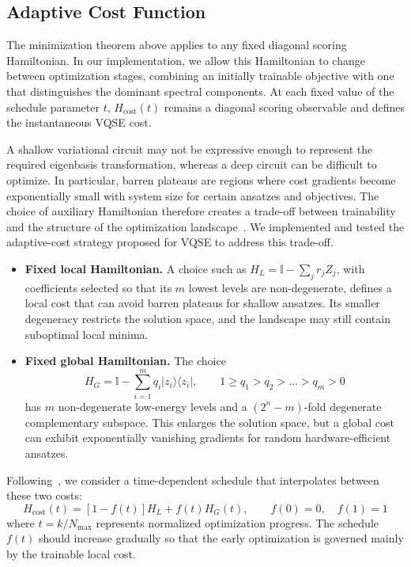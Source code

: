 \subsection{Adaptive Cost Function}\label{sec:vqse_adaptive_cost}

The minimization theorem above applies to any fixed diagonal scoring Hamiltonian. In our implementation, we allow this Hamiltonian to change between optimization stages, combining an initially trainable objective with one that distinguishes the dominant spectral components. At each fixed value of the schedule parameter $t$, $H_{\mathrm{cost}}(t)$ remains a diagonal scoring observable and defines the instantaneous VQSE cost.

A shallow variational circuit may not be expressive enough to represent the required eigenbasis transformation, whereas a deep circuit can be difficult to optimize. In particular, barren plateaus are regions where cost gradients become exponentially small with system size for certain ansatzes and objectives. The choice of auxiliary Hamiltonian therefore creates a trade-off between trainability and the structure of the optimization landscape~\cite{cerezo2022vqse}. We implemented and tested the adaptive-cost strategy proposed for VQSE to address this trade-off.

\begin{itemize}

    \item \textbf{Fixed local Hamiltonian.} A choice such as $H_L=\mathbb{I}-\sum_j r_jZ_j$, with coefficients selected so that its $m$ lowest levels are non-degenerate, defines a local cost that can avoid barren plateaus for shallow ansatzes. Its smaller degeneracy restricts the solution space, and the landscape may still contain suboptimal local minima.
    \item \textbf{Fixed global Hamiltonian.} The choice
          \begin{equation}
              H_G=\mathbb{I}-\sum_{i=1}^m q_i|z_i\rangle\langle z_i|,
              \qquad 1\geq q_1>q_2>\dots>q_m>0
              \label{eq:vqse_global_hamiltonian}
          \end{equation}
          has $m$ non-degenerate low-energy levels and a $(2^n-m)$-fold degenerate complementary subspace. This enlarges the solution space, but a global cost can exhibit exponentially vanishing gradients for random hardware-efficient ansatzes.
\end{itemize}

Following~\cite{cerezo2022vqse}, we consider a time-dependent schedule that interpolates between these two costs:
\begin{equation}
    H_{\mathrm{cost}}(t)=[1-f(t)]H_L+f(t)H_G(t),
    \qquad f(0)=0,\quad f(1)=1
    \label{eq:adaptive_hamiltonian}
\end{equation}
where $t=k/N_{\max}$ represents normalized optimization progress. The schedule $f(t)$ should increase gradually so that the early optimization is governed mainly by the trainable local cost.


